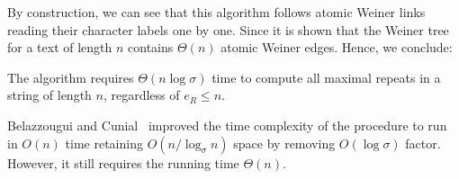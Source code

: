 By construction, we can see that this algorithm follows atomic Weiner links reading their character labels one by one. Since it is shown that the Weiner tree for a text of length $n$ contains $\Theta(n)$ atomic Weiner edges. Hence, we conclude: 

\begin{remark}
\label{rem:lb:tdbw}    
  The algorithm \TDBW{} requires $\Theta(n\log\sigma)$ time to compute all maximal repeats in a string of length $n$, regardless of $e_R \le n$. 
\end{remark}

Belazzougui and Cunial~\cite{belazzougui2015space:unusual} improved the time complexity of the procedure \TDBW{} to run in $O(n)$ time retaining $O(n/\log_\sigma n)$ space by removing $O(\log\sigma)$ factor. However, it still requires the running time $\Theta(n)$. 
